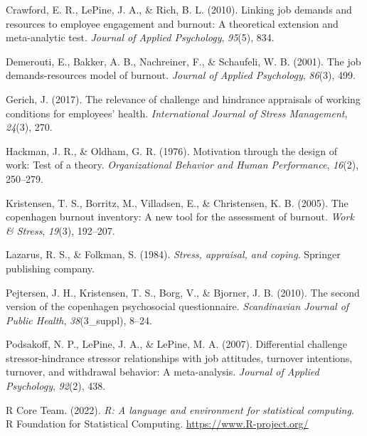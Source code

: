 \documentclass[
  man]{apa6}
\newlength{\cslhangindent}
\newlength{\cslentryspacingunit} %
\newenvironment{CSLReferences}[2] %
 {%
  \setlength{\parindent}{0pt}
  \ifodd #1
  \let\oldpar\par
  \def\par{\hangindent=\cslhangindent\oldpar}
  \fi
  \setlength{\parskip}{#2\cslentryspacingunit}
 }%
 {}
\begin{document}
\begin{CSLReferences}{1}{0}
\leavevmode{}%
Crawford, E. R., LePine, J. A., \& Rich, B. L. (2010). Linking job demands and resources to employee engagement and burnout: A theoretical extension and meta-analytic test. \emph{Journal of Applied Psychology}, \emph{95}(5), 834.

\leavevmode{}%
Demerouti, E., Bakker, A. B., Nachreiner, F., \& Schaufeli, W. B. (2001). The job demands-resources model of burnout. \emph{Journal of Applied Psychology}, \emph{86}(3), 499.

\leavevmode{}%
Gerich, J. (2017). The relevance of challenge and hindrance appraisals of working conditions for employees' health. \emph{International Journal of Stress Management}, \emph{24}(3), 270.

\leavevmode{}%
Hackman, J. R., \& Oldham, G. R. (1976). Motivation through the design of work: Test of a theory. \emph{Organizational Behavior and Human Performance}, \emph{16}(2), 250--279.

\leavevmode{}%
Kristensen, T. S., Borritz, M., Villadsen, E., \& Christensen, K. B. (2005). The copenhagen burnout inventory: A new tool for the assessment of burnout. \emph{Work \& Stress}, \emph{19}(3), 192--207.

\leavevmode{}%
Lazarus, R. S., \& Folkman, S. (1984). \emph{Stress, appraisal, and coping}. Springer publishing company.

\leavevmode{}%
Pejtersen, J. H., Kristensen, T. S., Borg, V., \& Bjorner, J. B. (2010). The second version of the copenhagen psychosocial questionnaire. \emph{Scandinavian Journal of Public Health}, \emph{38}(3\_suppl), 8--24.

\leavevmode{}%
Podsakoff, N. P., LePine, J. A., \& LePine, M. A. (2007). Differential challenge stressor-hindrance stressor relationships with job attitudes, turnover intentions, turnover, and withdrawal behavior: A meta-analysis. \emph{Journal of Applied Psychology}, \emph{92}(2), 438.

\leavevmode{}%
R Core Team. (2022). \emph{R: A language and environment for statistical computing}. R Foundation for Statistical Computing. \url{https://www.R-project.org/}


\end{CSLReferences}
\end{document}
